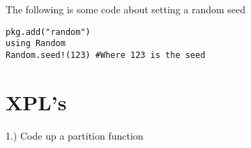 \documentclass[11pt]{exam}
\begin{document}
The following is some code about setting a random seed
\begin{lstlisting}
pkg.add("random")
using Random
Random.seed!(123) #Where 123 is the seed
\end{lstlisting}


\section{XPL's}
1.) Code up a partition function
\end{document}
